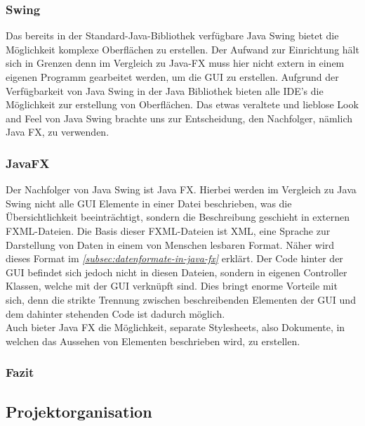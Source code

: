 \subsubsection{Swing}
Das bereits in der Standard-Java-Bibliothek verfügbare Java Swing bietet die Möglichkeit komplexe Oberflächen zu erstellen.
Der Aufwand zur Einrichtung hält sich in Grenzen denn im Vergleich zu Java-FX muss hier nicht extern in einem eigenen Programm gearbeitet werden, um die GUI zu erstellen.
Aufgrund der Verfügbarkeit von Java Swing in der Java Bibliothek bieten alle IDE's die Möglichkeit zur erstellung von Oberflächen.
Das etwas veraltete und lieblose Look and Feel von Java Swing brachte uns zur Entscheidung, den Nachfolger, nämlich Java FX, zu verwenden.
\subsubsection{JavaFX}\label{sssec: JavaFX}
Der Nachfolger von Java Swing ist Java FX. Hierbei werden im Vergleich zu Java Swing nicht alle GUI Elemente in einer Datei beschrieben, was die Übersichtlichkeit beeinträchtigt, sondern die Beschreibung geschieht in externen FXML-Dateien.
Die Basis dieser FXML-Dateien ist XML, eine Sprache zur Darstellung von Daten in einem von Menschen lesbaren Format.
Näher wird dieses Format im \textit{\autoref{subsec:datenformate-in-java-fx}} erklärt.
Der Code hinter der GUI befindet sich jedoch nicht in diesen Dateien, sondern in eigenen Controller Klassen, welche mit der GUI verknüpft sind.
Dies bringt enorme Vorteile mit sich, denn die strikte Trennung zwischen beschreibenden Elementen der GUI
und dem dahinter stehenden Code ist dadurch möglich.\\
Auch bieter Java FX die Möglichkeit, separate Stylesheets, also Dokumente, in welchen das Aussehen von Elementen beschrieben wird, zu erstellen.
\subsubsection{Fazit}

\subsection{Projektorganisation}\label{subsec:projektorganisation}
